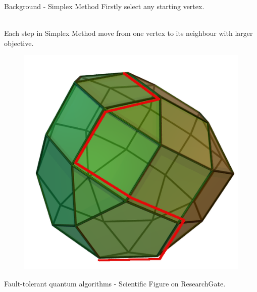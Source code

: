 \documentclass{beamer}
\begin{document}

\begin{frame}{Background - Simplex Method}
	Firstly select any starting vertex. \\~\

	Each step in Simplex Method move from one vertex to its neighbour with larger objective.

	\begin{figure}[r]
		\includegraphics[width=0.4\linewidth]{pics/simplex_method.png}
	\end{figure}
	{\centering \tiny Fault-tolerant quantum algorithms - Scientific Figure on ResearchGate. \par}


\end{frame}
\end{document}
